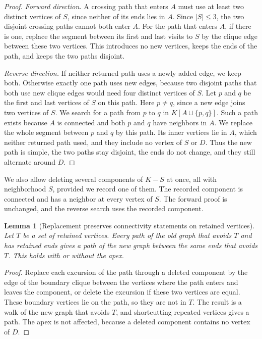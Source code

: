 \documentclass[11pt]{article}
\newtheorem{lemma}{Lemma}
\begin{document}
\begin{proof}
\emph{Forward direction.} A crossing path that enters $A$ must use at least two
distinct vertices of $S$, since neither of its ends lies in $A$. Since
$|S|\le3$, the two disjoint crossing paths cannot both enter $A$. For the path
that enters $A$, if there is one, replace the segment between its first and
last visits to $S$ by the clique edge between these two vertices. This
introduces no new vertices, keeps the ends of the path, and keeps the two paths
disjoint.

\emph{Reverse direction.} If neither returned path uses a newly added edge, we
keep both. Otherwise exactly one path uses new edges, because two disjoint
paths that both use new clique edges would need four distinct vertices of $S$.
Let $p$ and $q$ be the first and last vertices of $S$ on this path. Here
$p\ne q$, since a new edge joins two vertices of $S$. We search for a path from
$p$ to $q$ in $K[A\cup\{p,q\}]$. Such a path exists because $A$ is connected
and both $p$ and $q$ have neighbors in $A$. We replace the whole segment
between $p$ and $q$ by this path. Its inner vertices lie in $A$, which neither
returned path used, and they include no vertex of $S$ or $D$. Thus the new
path is simple, the two paths stay disjoint, the ends do not change, and they
still alternate around $D$.
\end{proof}

We also allow deleting several components of $K-S$ at once, all with
neighborhood $S$, provided we record one of them. The recorded component is
connected and has a neighbor at every vertex of $S$. The forward proof is
unchanged, and the reverse search uses the recorded component.

\begin{lemma}[Replacement preserves connectivity statements on retained vertices]\label{lem:retain}
Let $T$ be a set of retained vertices. Every path of the old graph that avoids
$T$ and has retained ends gives a path of the new graph between the same ends
that avoids $T$. This holds with or without the apex.
\end{lemma}

\begin{proof}
Replace each excursion of the path through a deleted component by the edge of
the boundary clique between the vertices where the path enters and leaves the
component, or delete the excursion if these two vertices are equal. These
boundary vertices lie on the path, so they are not in $T$. The result is a walk
of the new graph that avoids $T$, and shortcutting repeated vertices gives a
path. The apex is not affected, because a deleted component contains no vertex
of $D$.
\end{proof}
\end{document}
